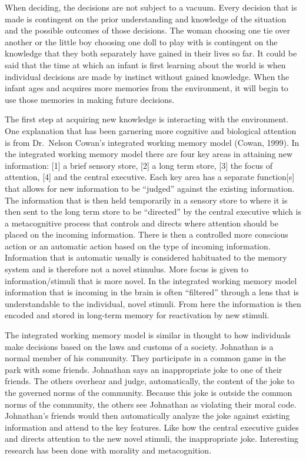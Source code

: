 \documentclass[
  english,
  donotrepeattitle,doc, 12pt, a4paper,floatsintext]{apa7}
\begin{document}
When deciding, the decisions are not subject to a vacuum. Every decision that is made is contingent on the prior understanding and knowledge of the situation and the possible outcomes of those decisions. The woman choosing one tie over another or the little boy choosing one doll to play with is contingent on the knowledge that they both separately have gained in their lives so far. It could be said that the time at which an infant is first learning about the world is when individual decisions are made by instinct without gained knowledge. When the infant ages and acquires more memories from the environment, it will begin to use those memories in making future decisions.

The first step at acquiring new knowledge is interacting with the environment. One explanation that has been garnering more cognitive and biological attention is from Dr.~Nelson Cowan's integrated working memory model (Cowan, 1999). In the integrated working memory model there are four key areas in attaining new information: {[}1{]} a brief sensory store, {[}2{]} a long term store, {[}3{]} the focus of attention, {[}4{]} and the central executive. Each key area has a separate function{[}s{]} that allows for new information to be ``judged'' against the existing information. The information that is then held temporarily in a sensory store to where it is then sent to the long term store to be ``directed'' by the central executive which is a metacognitive process that controls and directs where attention should be placed on the incoming information. There is then a controlled more conscious action or an automatic action based on the type of incoming information. Information that is automatic usually is considered habituated to the memory system and is therefore not a novel stimulus. More focus is given to information/stimuli that is more novel. In the integrated working memory model information that is incoming in the brain is often ``filtered'' through a lens that is understandable to the individual, novel stimuli. From here the information is then encoded and stored in long-term memory for reactivation by new stimuli.

The integrated working memory model is similar in thought to how individuals make decisions based on the laws and customs of a society. Johnathan is a normal member of his community. They participate in a common game in the park with some friends. Johnathan says an inappropriate joke to one of their friends. The others overhear and judge, automatically, the content of the joke to the governed norms of the community. Because this joke is outside the common norms of the community, the others see Johnathan as violating their moral code. Johnathan's friends would then automatically analyze the joke against existing information and attend to the key features. Like how the central executive guides and directs attention to the new novel stimuli, the inappropriate joke. Interesting research has been done with morality and metacognition.
\end{document}
